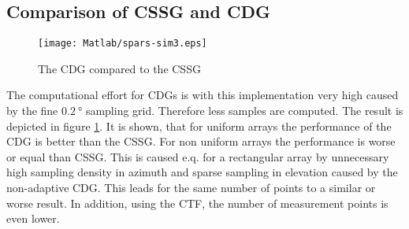\subsection{Comparison of CSSG and CDG}

\begin{figure}[h]
\centering
\texttt{[image: Matlab/spars-sim3.eps]}
\caption{The CDG compared to the CSSG}
\label{fig:cdg}
\end{figure}

The computational effort for \acp{CDG} is with this implementation very high caused by the fine $\SI{0.2}{\degree}$ sampling grid. Therefore less samples are computed. The result is depicted in figure \ref{fig:cdg}. It is shown, that for uniform arrays the performance of the \ac{CDG} is better than the \ac{CSSG}. For non uniform arrays the performance is worse or equal than \ac{CSSG}. This is caused e.q. for a rectangular array by unnecessary high sampling density in azimuth and sparse sampling in elevation caused by the non-adaptive \ac{CDG}. This leads for the same number of points to a similar or worse result. In addition, using the \ac{CTF}, the number of measurement points is even lower.



